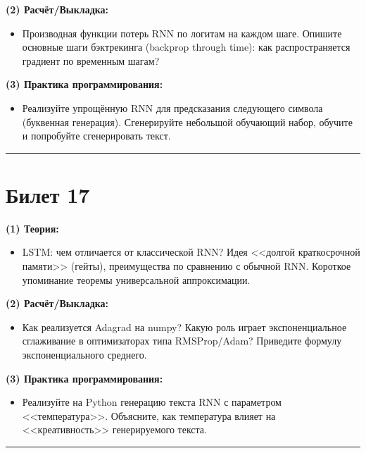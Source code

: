 \documentclass[a4paper,12pt]{article}
\begin{document}
\textbf{(2) Расчёт/Выкладка:}
\begin{itemize}
  \item Производная функции потерь RNN по логитам на каждом шаге. Опишите основные шаги бэктрекинга (backprop through time): как распространяется градиент по временным шагам?
\end{itemize}

\textbf{(3) Практика программирования:}
\begin{itemize}
  \item Реализуйте упрощённую RNN для предсказания следующего символа (буквенная генерация). Сгенерируйте небольшой обучающий набор, обучите и попробуйте сгенерировать текст.
\end{itemize}

\noindent\rule{\textwidth}{0.4pt}
\newpage

\section*{Билет 17}
\textbf{(1) Теория:}
\begin{itemize}
  \item LSTM: чем отличается от классической RNN? Идея <<долгой краткосрочной памяти>> (гейты), преимущества по сравнению с обычной RNN. Короткое упоминание теоремы универсальной аппроксимации.
\end{itemize}

\textbf{(2) Расчёт/Выкладка:}
\begin{itemize}
  \item Как реализуется Adagrad на numpy? Какую роль играет экспоненциальное сглаживание в оптимизаторах типа RMSProp/Adam? Приведите формулу экспоненциального среднего.
\end{itemize}

\textbf{(3) Практика программирования:}
\begin{itemize}
  \item Реализуйте на Python генерацию текста RNN с параметром <<температура>>. Объясните, как температура влияет на <<креативность>> генерируемого текста.
\end{itemize}

\noindent\rule{\textwidth}{0.4pt}
\end{document}

